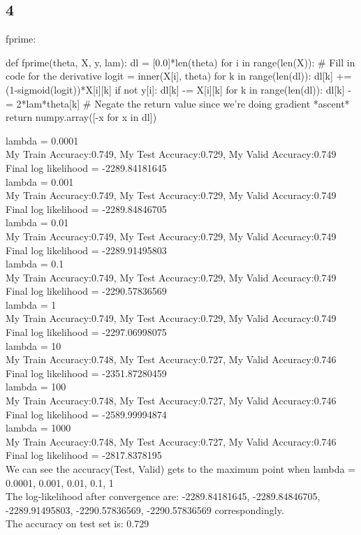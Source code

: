 \documentclass [11pt, a4paper, oneside] {article}
\begin{document}
\subsection *{4}
fprime:\\
\begin {python}
def fprime(theta, X, y, lam):
  dl = [0.0]*len(theta)
  for i in range(len(X)):
    # Fill in code for the derivative
    logit = inner(X[i], theta)
    for k in range(len(dl)):
        dl[k] += (1-sigmoid(logit))*X[i][k]
        if not y[i]:
            dl[k] -= X[i][k]
  for k in range(len(dl)):
    dl[k] -= 2*lam*theta[k]
  # Negate the return value since we're doing gradient *ascent*
  return numpy.array([-x for x in dl])
\end{python}
lambda = 0.0001\\
My Train Accuracy:0.749, My Test Accuracy:0.729, My Valid Accuracy:0.749\\
Final log likelihood = -2289.84181645\\
lambda = 0.001\\
My Train Accuracy:0.749, My Test Accuracy:0.729, My Valid Accuracy:0.749\\
Final log likelihood = -2289.84846705\\
lambda = 0.01\\
My Train Accuracy:0.749, My Test Accuracy:0.729, My Valid Accuracy:0.749\\
Final log likelihood = -2289.91495803\\
lambda = 0.1\\
My Train Accuracy:0.749, My Test Accuracy:0.729, My Valid Accuracy:0.749\\
Final log likelihood = -2290.57836569\\
lambda = 1\\
My Train Accuracy:0.749, My Test Accuracy:0.729, My Valid Accuracy:0.749\\
Final log likelihood = -2297.06998075\\
lambda = 10\\
My Train Accuracy:0.748, My Test Accuracy:0.727, My Valid Accuracy:0.746\\
Final log likelihood = -2351.87280459\\
lambda = 100\\
My Train Accuracy:0.748, My Test Accuracy:0.727, My Valid Accuracy:0.746\\
Final log likelihood = -2589.99994874\\
lambda = 1000\\
My Train Accuracy:0.748, My Test Accuracy:0.727, My Valid Accuracy:0.746\\
Final log likelihood = -2817.8378195\\
We can see the accuracy(Test, Valid) gets to the maximum point when lambda = 0.0001, 0.001, 0.01, 0.1, 1\\
The log-likelihood after convergence are: -2289.84181645, -2289.84846705, -2289.91495803,  -2290.57836569, -2290.57836569 correspondingly.\\
The accuracy on test set is: 0.729\\
\end{document}
